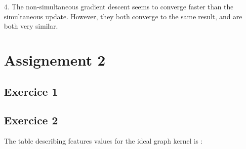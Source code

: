 \documentclass{article}
\begin{document}
    4. The non-simultaneous gradient descent seems to converge faster than the simultaneous update.
    However, they both converge to the same result, and are both very similar. \\

    \section{Assignement 2}

    \subsection{Exercice 1}


    \subsection{Exercice 2}

    The table describing features values for the ideal graph kernel is :
\end{document}
